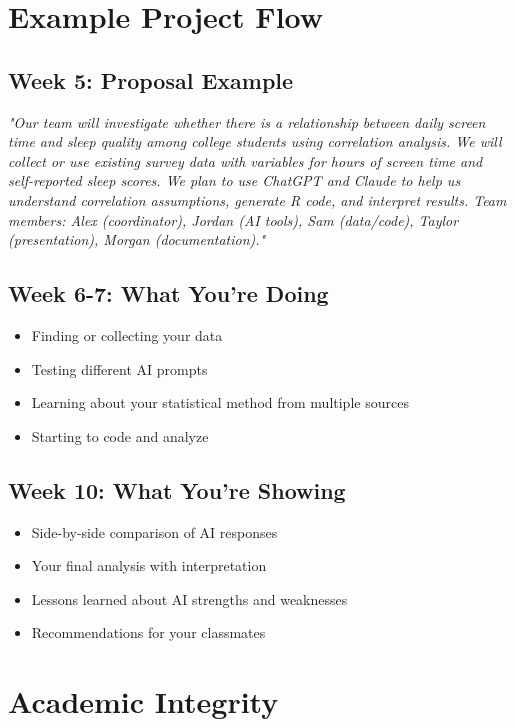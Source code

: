 \documentclass[11pt]{article}
\begin{document}
\section{Example Project Flow}

\subsection{Week 5: Proposal Example}
\textit{"Our team will investigate whether there is a relationship between daily screen time and sleep quality among college students using correlation analysis. We will collect or use existing survey data with variables for hours of screen time and self-reported sleep scores. We plan to use ChatGPT and Claude to help us understand correlation assumptions, generate R code, and interpret results. Team members: Alex (coordinator), Jordan (AI tools), Sam (data/code), Taylor (presentation), Morgan (documentation)."}

\subsection{Week 6-7: What You're Doing}
\begin{itemize}
\item Finding or collecting your data
\item Testing different AI prompts
\item Learning about your statistical method from multiple sources
\item Starting to code and analyze
\end{itemize}

\subsection{Week 10: What You're Showing}
\begin{itemize}
\item Side-by-side comparison of AI responses
\item Your final analysis with interpretation
\item Lessons learned about AI strengths and weaknesses
\item Recommendations for your classmates
\end{itemize}

\section{Academic Integrity}
\end{document}
